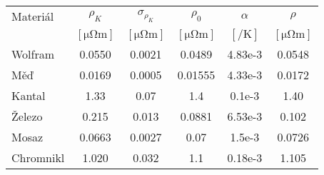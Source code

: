 \begin{tabular}{lSSSS[table-format=1.3e2]S}                                                                                                                                                       \toprule
Materiál  & {$\rho_K$}                  & {$\sigma_{\rho_K}$}         & {$\rho_0$}                  & {$\alpha$}             & {$\rho$}                    \\
          & {$[\si{\micro\ohm\metre}]$} & {$[\si{\micro\ohm\metre}]$} & {$[\si{\micro\ohm\metre}]$} & {$[\si{\per\kelvin}]$} & {$[\si{\micro\ohm\metre}]$} \\ \midrule
Wolfram   & 0.0550                      & 0.0021                      & 0.0489                      & 4.83e-3                & 0.0548                      \\
Měď       & 0.0169                      & 0.0005                      & 0.01555                     & 4.33e-3                & 0.0172                      \\
Kantal    & 1.33                        & 0.07                        & 1.4                         & 0.1e-3                 & 1.40                        \\
Železo    & 0.215                       & 0.013                       & 0.0881                      & 6.53e-3                & 0.102                       \\
Mosaz     & 0.0663                      & 0.0027                      & 0.07                        & 1.5e-3                 & 0.0726                      \\
Chromnikl & 1.020                       & 0.032                       & 1.1                         & 0.18e-3                & 1.105                       \\  \bottomrule
\end{tabular}
